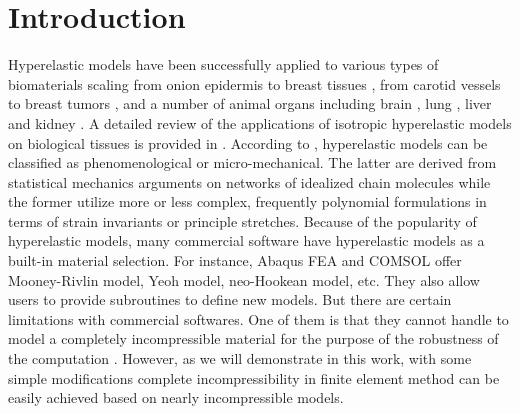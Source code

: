 \section{Introduction}
Hyperelastic models have been successfully applied to various types of biomaterials scaling from onion epidermis \cite{Qian} to breast tissues \cite{OHagen}, from carotid vessels \cite{Zidi, Zidi2, Bols} to breast tumors \cite{Oberai}, and a number of animal organs including brain \cite{Karimi, Samani, Gilchrist}, lung  \cite{Wall, Wall2}, liver and kidney \cite{Fu, Untaroiu, Willinger}. A detailed review of the applications of isotropic hyperelastic models on biological tissues is provided in \cite{Kupriyanova}.
According to \cite{Steinmann}, hyperelastic models can be classified as phenomenological or micro-mechanical. The latter are derived from statistical mechanics arguments on networks of idealized chain molecules while the former utilize more or less complex, frequently polynomial formulations in terms of strain invariants or principle stretches. Because of the popularity of hyperelastic models, many commercial software have hyperelastic models as a built-in material selection. For instance, Abaqus FEA and COMSOL offer Mooney-Rivlin model, Yeoh model, neo-Hookean model, etc. They also allow users to provide subroutines to define new models. But there are certain limitations with commercial softwares. One of them is that they cannot handle to model a completely incompressible material for the purpose of the robustness of the computation \cite{Abaqus}. However, as we will demonstrate in this work, with some simple modifications complete incompressibility in finite element method can be easily achieved based on nearly incompressible models.

